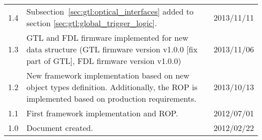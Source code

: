 \begin{longtable}{|c|p{}|c|}
$$1.4 & Subsection~\ref{sec:gtl:optical_interfaces} added to section \ref{sec:gtl:global_trigger_logic}. & 2013/11/11\\
1.3 & GTL and FDL firmware implemented for new data structure (GTL firmware version v1.0.0 [fix part of GTL], FDL firmware version v1.0.0) & 2013/11/06\\
1.2 & New framework implementation based on new object types definition. Additionally, the ROP is implemented based on production requirements. & 2013/10/13\\
1.1 & First framework implementation and ROP. & 2012/07/01\\
1.0 & Document created. & 2012/02/22\\
\hline
\end{longtable}

\clearpage{}
